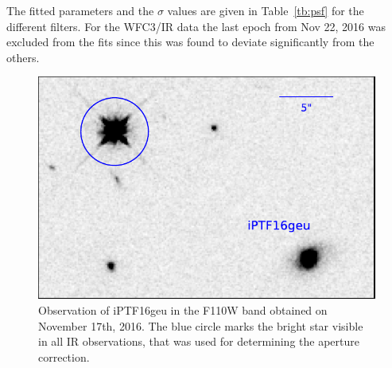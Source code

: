 \documentclass[a4paper,fleqn,usenatbib]{mnras}
\newcommand{\geu}{iPTF16geu\xspace}
\newcommand{\wfcir}{WFC3/IR\xspace}
\begin{document}
The fitted parameters and the $\sigma$ values are given in Table~\ref{tb:psf} for the different filters.  For the \wfcir data the last 
epoch from Nov 22, 2016 was excluded from the fits since this was found to deviate significantly from the others.

\begin{table}
\centering
\caption{%
   Table of the derived PSF parameters and the estimated standard deviations PSF and aperture photometry 
   for all stars in each given.  Here, the full width at half maximum was calculated as 
   $\mathrm{FWHM} = 2\gamma\left(2^{1/\alpha}-1\right)^{1/2}$. See the text for further details.
  \label{tb:psf}
}

\end{table}


\begin{figure}
\centering
\includegraphics[width=\columnwidth]{psf_ir_star.pdf}
\caption{%
	Observation of \geu in the F110W band obtained on November 17th, 2016.  The blue circle marks the bright star visible in
	all IR observations, that was used for determining the aperture correction.
	\label{fig:psfnir}
}
\end{figure}
\end{document}
